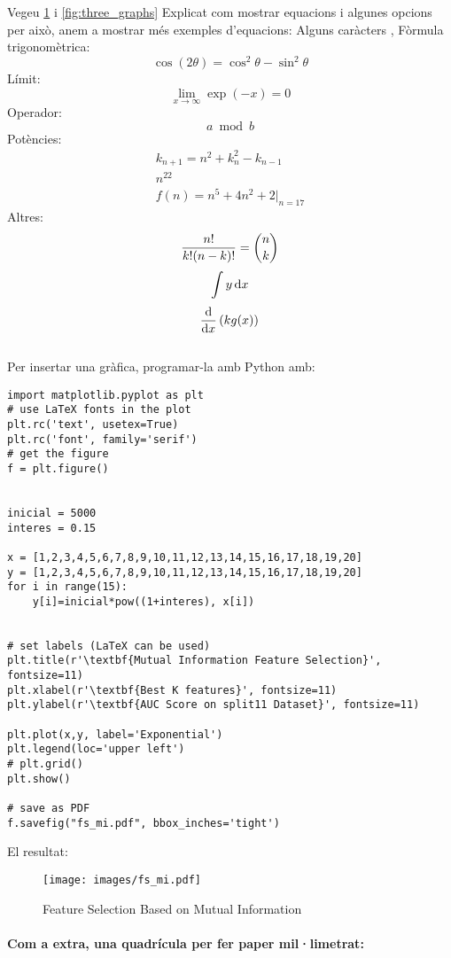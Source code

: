 %
%
Vegeu \ref{fig:fs_mi} i \ref{fig:three_graphs}
%
Explicat com mostrar equacions i algunes opcions per això, anem a mostrar més exemples d'equacions:
Alguns caràcters , 
%
Fòrmula trigonomètrica:
\begin{equation*}
	\cos (2\theta) = \cos^2 \theta - \sin^2 \theta
\end{equation*}
Límit:
\begin{equation*}
	\lim\limits_{x \to \infty} \exp(-x) = 0
\end{equation*}
Operador:
\begin{equation*}
	a \bmod b
\end{equation*}
Potències:
\begin{align*}
	k_{n+1} = n^2 + k_n^2 - k_{n-1} \\
	n^{22} \\
	f(n) = n^5 + 4n^2 + 2 |_{n=17}
\end{align*}
Altres:
\begin{equation*}
	\frac{n!}{k!(n-k)!} = \binom{n}{k} \\
\end{equation*}
\begin{equation*}
	\int y\, \mathrm{d}x \\
\end{equation*}
\begin{equation*}
	\frac{\mathrm d}{\mathrm d x} \left( k g(x) \right) \\
\end{equation*}
\\
Per insertar una gràfica, programar-la amb Python amb:
%
\begin{lstlisting}
import matplotlib.pyplot as plt
# use LaTeX fonts in the plot
plt.rc('text', usetex=True)
plt.rc('font', family='serif')
# get the figure
f = plt.figure()


inicial = 5000
interes = 0.15

x = [1,2,3,4,5,6,7,8,9,10,11,12,13,14,15,16,17,18,19,20]
y = [1,2,3,4,5,6,7,8,9,10,11,12,13,14,15,16,17,18,19,20]
for i in range(15):
    y[i]=inicial*pow((1+interes), x[i])


# set labels (LaTeX can be used)
plt.title(r'\textbf{Mutual Information Feature Selection}', fontsize=11)
plt.xlabel(r'\textbf{Best K features}', fontsize=11)
plt.ylabel(r'\textbf{AUC Score on split11 Dataset}', fontsize=11)

plt.plot(x,y, label='Exponential')
plt.legend(loc='upper left')
# plt.grid()
plt.show()

# save as PDF
f.savefig("fs_mi.pdf", bbox_inches='tight')
\end{lstlisting}
El resultat:
\begin{figure}[H]
\centering
\texttt{[image: images/fs\_mi.pdf]}
\caption{Feature Selection Based on Mutual Information}
\label{fig:fs_mi}
\end{figure}
%
\paragraph{Com a extra, una quadrícula per fer paper mil·limetrat:}
%
